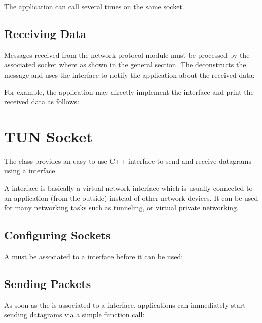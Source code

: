 The application can call  several times on the same socket.

\subsection*{Receiving Data}

Messages received from the network protocol module must be processed by the
associated socket where as shown in the general section. The 
deconstructs the message and uses the  interface
to notify the application about the received data:


For example, the application may directly implement the
 interface and print the received data as follows:


\section{TUN Socket}

The  class provides an easy to use C++ interface to send and
receive datagrams using a  interface.

A  interface is basically a virtual network interface which is
usually connected to an application (from the outside) instead of other network
devices. It can be used for many networking tasks such as tunneling, or virtual
private networking.

\subsection*{Configuring Sockets}

A  must be associated to a  interface before
it can be used:


\subsection*{Sending Packets}

As soon as the  is associated to a  interface,
applications can immediately start sending datagrams via a simple function call:

